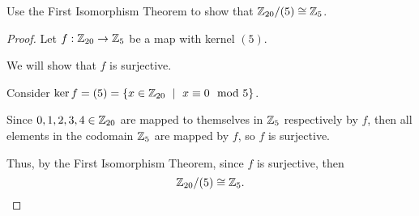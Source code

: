 \documentclass[../hw8]{subfiles}
\begin{document}
\begin{problem}
Use the First Isomorphism Theorem to show that $\mathbb{Z}_{20} / (5) \cong \mathbb{Z}_5 $.
\end{problem}
\begin{proof}
	Let $f:\mathbb{Z}_{20}\to \mathbb{Z}_5$ be a map with kernel $(5)$.

	We will show that  $f$ is surjective.

	Consider  $\ker{f}=(5)=\{x \in \Z_{20}\ \mid\ x\equiv 0 \mod{5}\}  $.

	Since $0,1,2,3,4 \in \mathbb{Z}_{20}$ are mapped to themselves in $\mathbb{Z}_5$ respectively by $f$,
	then all elements in the codomain $\mathbb{Z}_5$ are mapped by $f$,
	so $f$ is surjective.

	Thus, by the First Isomorphism Theorem, since $f$ is surjective, then \[
		\mathbb{Z}_{20} / (5) \cong \mathbb{Z}_5
		.\]
\end{proof}
\end{document}

